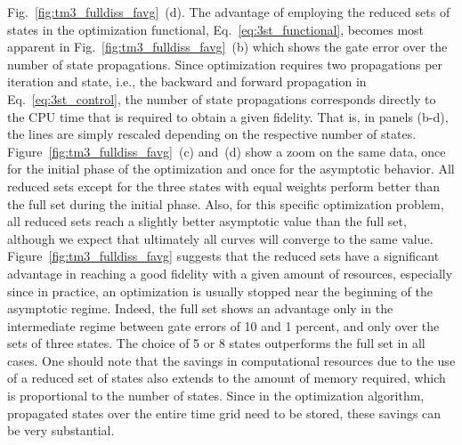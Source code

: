 Fig.~\ref{fig:tm3_fulldiss_favg}~(d).
The advantage of employing the reduced sets of
states in the optimization functional, Eq.~\eqref{eq:3st_functional},
becomes most apparent in Fig.~\ref{fig:tm3_fulldiss_favg}~(b)
which shows the gate error over the number of state
propagations. Since optimization requires two propagations per
iteration and state, i.e., the
backward and forward propagation in Eq.~\eqref{eq:3st_control}, the number
of state propagations corresponds directly to the CPU time that is
required to obtain a given
fidelity. That is, in panels (b-d), the lines are simply rescaled depending on the
respective number of states. Figure~\ref{fig:tm3_fulldiss_favg}~(c) and~(d)
show a zoom on the same data, once for the initial phase
of the optimization and once for the asymptotic behavior. All reduced sets
except for the three states with equal weights perform better than the
full set during the
initial phase.  Also, for this specific optimization problem, all reduced sets
reach a slightly better asymptotic value than the full set, although we
expect that ultimately all curves will converge to the same value.
Figure~\ref{fig:tm3_fulldiss_favg} suggests that
the reduced sets have a significant
advantage in reaching a good fidelity with a given amount of resources, especially
since in practice, an optimization is usually stopped near the beginning of the
asymptotic regime. Indeed, the full set shows an advantage only in the
intermediate regime between gate errors of 10 and 1 percent, and only over the
sets of three states. The choice of 5 or 8 states outperforms the full set in
all cases.
One should note that the savings in computational resources due to the
use of a reduced set of
states also extends to the amount of memory required, which is proportional to
the number of states. Since in the optimization algorithm, propagated states
over the entire time grid need to be stored, these savings can be very
substantial.


